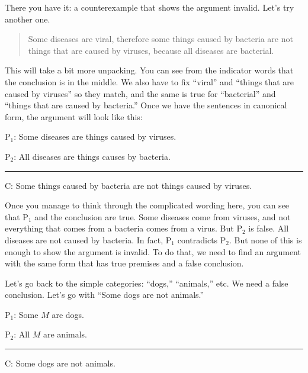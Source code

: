 There you have it: a counterexample that shows the argument invalid. Let's try another one. 

\begin{quotation}
Some diseases are viral, therefore some things caused by bacteria are not things that are caused by viruses, because all diseases are bacterial.
\end{quotation}

This will take a bit more unpacking. You can see from the indicator words that the conclusion is in the middle. We also have to fix ``viral'' and ``things that are caused by viruses'' so they match, and the same is true for ``bacterial'' and ``things that are caused by bacteria.'' Once we have the sentences in canonical form, the argument will look like this:

\begin{earg} 
\item[P$_1$:] Some diseases are things caused by viruses.
\item[P$_2$:] All diseases are things causes by bacteria.
\vspace{-.5em} 
 \item [] \rule{0.7\linewidth}{.5pt} 
\item[C:] Some things caused by bacteria are not things caused by viruses.
 \end{earg}

Once you manage to think through the complicated wording here, you can see that P$_1$ and the conclusion are true. Some diseases come from viruses, and not everything that comes from a bacteria comes from a virus. But P$_2$ is false. All diseases are not caused by bacteria. In fact, P$_1$ contradicts P$_2$. But none of this is enough to show the argument is invalid. To do that, we need to find an argument with the same form that has true premises and a false conclusion. 

Let's go back to the simple categories: ``dogs,'' ``animals,'' etc. We need a false conclusion. Let's go with ``Some dogs are not animals.'' 

\begin{earg} 
\item[P$_1$:] Some $M$ are dogs.
\item[P$_2$:] All $M$ are animals.
\vspace{-.5em} 
 \item [] \rule{0.3\linewidth}{.5pt} 
\item[C:] Some dogs are not animals.
 \end{earg}

